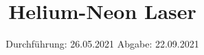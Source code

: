 

\subject{V 61}
\title{Helium-Neon Laser}
\date{%
  Durchführung: 26.05.2021
  \hspace{3em}
  Abgabe: 22.09.2021
}
\usepackage{nicefrac}


\maketitle
\thispagestyle{empty}
\tableofcontents
\newpage








\printbibliography{}


